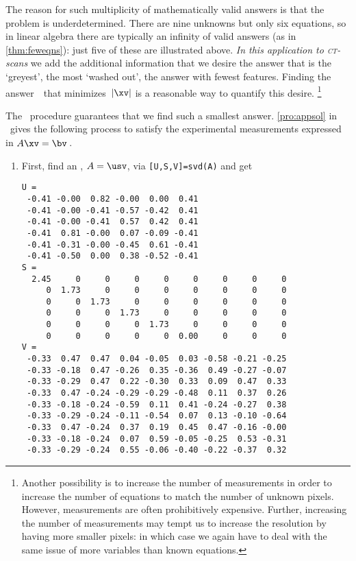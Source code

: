 \begin{example}
The reason for such multiplicity of mathematically valid answers is that the problem is underdetermined.  
There are nine unknowns but only six equations, so in linear algebra there are typically an infinity of valid answers (as in \autoref{thm:feweqns}): just five of these are illustrated above.
\emph{In this application to \textsc{ct}-scans} we add the additional information that we desire the answer that is the `greyest', the most `washed out', the answer with fewest features.
Finding the answer~\xv\ that minimizes~\(|\xv|\) is a reasonable way to quantify this desire.%
\footnote{Another possibility is to increase the number of measurements in order to increase the number of equations to match the number of unknown pixels.
However, measurements are often prohibitively expensive.
Further, increasing the number of measurements may tempt us to increase the resolution by having more smaller pixels: in which case we again have to deal with the same issue of more variables than known equations.}

The \svd\ procedure guarantees that we find such a smallest answer.
\autoref{pro:appsol} in \script\ gives the following process to satisfy the experimental measurements expressed in \(A\xv=\bv\)\,.
\begin{enumerate}
\item First, find an \svd, \(A=\usv\), via \verb|[U,S,V]=svd(A)| and get \twodp
\setbox\ajrqrbox\hbox{}%
\marginajrbox%
\begin{small}
\begin{verbatim}
U =
 -0.41 -0.00  0.82 -0.00  0.00  0.41
 -0.41 -0.00 -0.41 -0.57 -0.42  0.41
 -0.41 -0.00 -0.41  0.57  0.42  0.41
 -0.41  0.81 -0.00  0.07 -0.09 -0.41
 -0.41 -0.31 -0.00 -0.45  0.61 -0.41
 -0.41 -0.50  0.00  0.38 -0.52 -0.41
S =
  2.45     0     0     0     0     0     0     0     0
     0  1.73     0     0     0     0     0     0     0
     0     0  1.73     0     0     0     0     0     0
     0     0     0  1.73     0     0     0     0     0
     0     0     0     0  1.73     0     0     0     0
     0     0     0     0     0  0.00     0     0     0
V =
 -0.33  0.47  0.47  0.04 -0.05  0.03 -0.58 -0.21 -0.25
 -0.33 -0.18  0.47 -0.26  0.35 -0.36  0.49 -0.27 -0.07
 -0.33 -0.29  0.47  0.22 -0.30  0.33  0.09  0.47  0.33
 -0.33  0.47 -0.24 -0.29 -0.29 -0.48  0.11  0.37  0.26
 -0.33 -0.18 -0.24 -0.59  0.11  0.41 -0.24 -0.27  0.38
 -0.33 -0.29 -0.24 -0.11 -0.54  0.07  0.13 -0.10 -0.64
 -0.33  0.47 -0.24  0.37  0.19  0.45  0.47 -0.16 -0.00
 -0.33 -0.18 -0.24  0.07  0.59 -0.05 -0.25  0.53 -0.31
 -0.33 -0.29 -0.24  0.55 -0.06 -0.40 -0.22 -0.37  0.32
\end{verbatim}
\end{small}



\end{enumerate}
\end{example}
